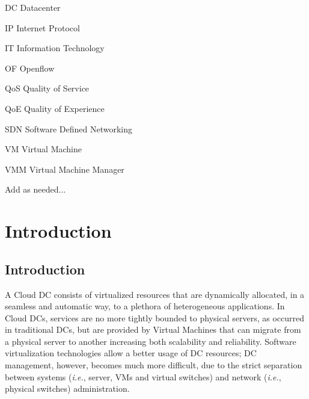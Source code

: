 \documentclass[12pt,english,oneside]{book}
\newenvironment{lyxlist}[1]
   {\begin{list}{}
     {\settowidth{\labelwidth}{#1}
      \setlength{\leftmargin}{\labelwidth}
      \addtolength{\leftmargin}{\labelsep}
      \renewcommand{\makelabel}[1]{##1\hfil}}}
   {\end{list}}
\begin{document}


\begin{lyxlist}{00.00.0000}
\begin{singlespace}
\item [DC]Datacenter
\item [IP]Internet Protocol 
\item [IT]Information Technology
\item [OF]Openflow
\item [QoS] Quality of Service
\item [QoE] Quality of Experience
\item [SDN]Software Defined Networking
\item [VM]Virtual Machine
\item [VMM]Virtual Machine Manager
\item Add as needed...
\end{singlespace}
\end{lyxlist}


\listoffigures


\listoftables


\setcounter{page}{0}



\chapter{Introduction\label{cha:introduction}}

\section{Introduction}
\hspace{0.6cm}

A Cloud DC consists of virtualized resources that are dynamically allocated, in a seamless and automatic way, to a plethora of heterogeneous applications.
In Cloud DCs, services are no more tightly bounded to physical servers, as occurred in traditional DCs, but are provided by Virtual Machines that can migrate from a physical server to another increasing both scalability and reliability.
Software virtualization technologies allow a better usage of DC resources; DC management, however, becomes much more difficult, due to the strict separation between systems (\textit{i.e.}, server, VMs and virtual switches) and network (\textit{i.e.}, physical switches) administration.
\end{document}
